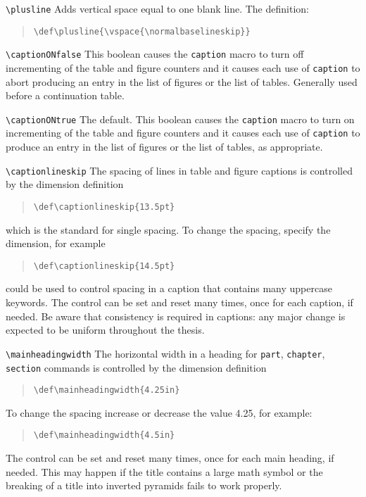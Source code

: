 \begin{description}
\item \verb|\plusline|
Adds vertical space equal to one blank line. The definition:
\begin{quote}
\verb|\def\plusline{\vspace{\normalbaselineskip}}|
\end{quote}

\item \verb|\captionONfalse|
This boolean causes the {\tt caption} macro to turn off incrementing of
the table and figure counters and it causes each use of {\tt caption} to
abort producing an entry in the list of figures or the list of tables.
Generally used before a continuation table.

\item \verb|\captionONtrue|
The default.
This boolean causes the {\tt caption} macro to turn on incrementing of
the table and figure counters and it causes each use of {\tt caption} to
produce an entry in the list of figures or the list of tables, as
appropriate.

\item \verb|\captionlineskip|
The spacing of lines in table and figure captions is controlled
by
the dimension definition
\begin{quote}
\verb|\def\captionlineskip{13.5pt}|
\end{quote}
\noindent
which is the standard for single spacing.
To change the spacing, specify the dimension, for example
\begin{quote}
\verb|\def\captionlineskip{14.5pt}|
\end{quote}
\noindent
could be used to control spacing in a caption that contains many
uppercase keywords.
The control can be set and reset many times, once for
each caption, if needed. Be aware that consistency is required in
captions: any major change is expected to be uniform throughout the
thesis.

\item \verb|\mainheadingwidth|
The horizontal width in a heading for {\tt part}, {\tt chapter}, {\tt
section} commands is controlled by the dimension definition
\begin{quote}
\verb|\def\mainheadingwidth{4.25in}|
\end{quote}
\noindent
To change the spacing increase or decrease the value 4.25, for example:
\begin{quote}
\verb|\def\mainheadingwidth{4.5in}|
\end{quote}
\noindent
The control can be set and reset many times, once for each main heading,
if needed. This may happen if the title contains a large math symbol or
the breaking of a title into inverted pyramids fails to work properly.


\end{description}
